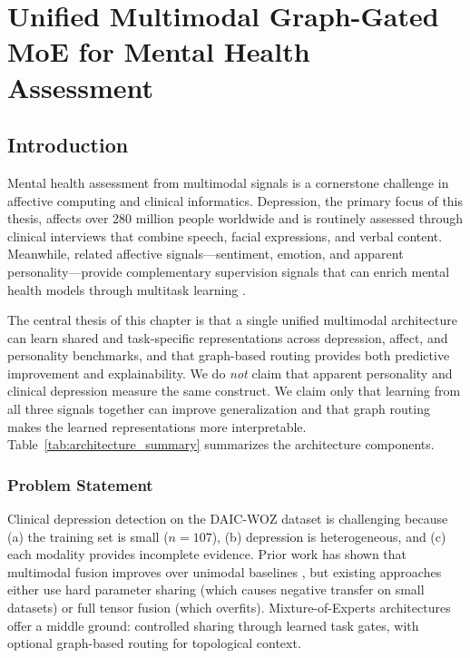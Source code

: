 \documentclass[12pt,oneside]{book}
\begin{document}
\chapter{Unified Multimodal Graph-Gated MoE for Mental Health Assessment}
\label{chap:unified_model}

\section{Introduction}

Mental health assessment from multimodal signals is a cornerstone challenge in affective computing and clinical informatics. Depression, the primary focus of this thesis, affects over 280 million people worldwide \citep{who2023depression} and is routinely assessed through clinical interviews that combine speech, facial expressions, and verbal content. Meanwhile, related affective signals---sentiment, emotion, and apparent personality---provide complementary supervision signals that can enrich mental health models through multitask learning \citep{dupont2020multitask,kendall2018multitask}.

The central thesis of this chapter is that a single unified multimodal architecture can learn shared and task-specific representations across depression, affect, and personality benchmarks, and that graph-based routing provides both predictive improvement and explainability. We do \emph{not} claim that apparent personality and clinical depression measure the same construct. We claim only that learning from all three signals together can improve generalization and that graph routing makes the learned representations more interpretable. Table~\ref{tab:architecture_summary} summarizes the architecture components.



\subsection{Problem Statement}

Clinical depression detection on the DAIC-WOZ dataset \citep{gratch2014distress} is challenging because (a) the training set is small ($n=107$), (b) depression is heterogeneous, and (c) each modality provides incomplete evidence. Prior work has shown that multimodal fusion improves over unimodal baselines \citep{niu2021multimodal,dai2021fullfusion}, but existing approaches either use hard parameter sharing (which causes negative transfer on small datasets) or full tensor fusion (which overfits). Mixture-of-Experts architectures \citep{shazeer2017moe,jacobs2024mmoe} offer a middle ground: controlled sharing through learned task gates, with optional graph-based routing for topological context.
\end{document}
